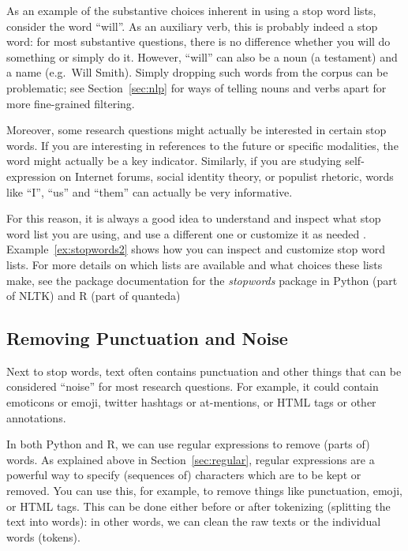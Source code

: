 As an example of the substantive choices inherent in using a stop word lists,
consider the word ``will''.
As an auxiliary verb, this is probably indeed a stop word: for most substantive questions, there is no difference
whether you will do something or simply do it.
However, ``will'' can also be a noun (a testament) and a name (e.g.\ Will Smith).
Simply dropping such words from the corpus can be problematic; see Section~\ref{sec:nlp} for ways of telling nouns and verbs apart
for more fine-grained filtering.

Moreover, some research questions might actually be interested in certain stop words.
If you are interesting in references to the future or specific modalities,
the word might actually be a key indicator.
Similarly, if you are studying self-expression on Internet forums, social identity theory, or populist rhetoric,
words like ``I'', ``us'' and ``them'' can actually be very informative.

For this reason, it is always a good idea to understand and inspect what stop word list you are using,
and use a different one or customize it as needed \citep[see also][]{nothman18}.
Example~\ref{ex:stopwords2} shows how you can inspect and customize stop word lists.
For more details on which lists are available and what choices these lists make,
see the package documentation for the \emph{stopwords} package in Python (part of NLTK) and R (part of quanteda)




\subsection{Removing Punctuation and Noise}


Next to stop words, text often contains punctuation and other things that can be considered ``noise'' for most research questions.
For example, it could contain emoticons or emoji, twitter hashtags or at-mentions, or HTML tags or other annotations.

In both Python and R, we can use regular expressions to remove (parts of) words.
As explained above in Section~\ref{sec:regular}, regular expressions are a powerful way to specify (sequences of) characters which are to be kept or removed.
You can use this, for example, to remove things like punctuation, emoji, or HTML tags.
This can be done either before or after tokenizing (splitting the text into words):
in other words, we can clean the raw texts or the individual words (tokens).

